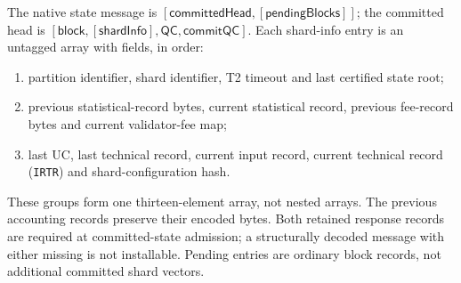 The native state message is $[\mathsf{committedHead},[\mathsf{pendingBlocks}]]$; the committed head is $[\mathsf{block},[\mathsf{shardInfo}],\mathsf{QC},\mathsf{commitQC}]$. Each shard-info entry is an untagged array with fields, in order:
\begin{enumerate}
\item partition identifier, shard identifier, T2 timeout and last certified state root;
\item previous statistical-record bytes, current statistical record, previous fee-record bytes and current validator-fee map;
\item last UC, last technical record, current input record, current technical record (\texttt{IRTR}) and shard-configuration hash.
\end{enumerate}
These groups form one thirteen-element array, not nested arrays. The previous accounting records preserve their encoded bytes. Both retained response records are required at committed-state admission; a structurally decoded message with either missing is not installable. Pending entries are ordinary block records, not additional committed shard vectors.
